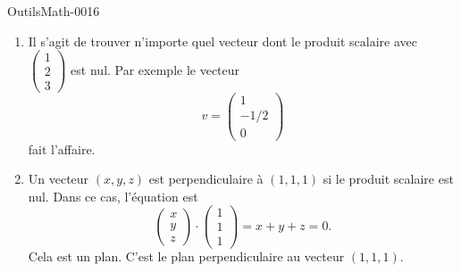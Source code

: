 
\begin{corrige}{OutilsMath-0016}

	\begin{enumerate}
		\item
			Il s'agit de trouver n'importe quel vecteur dont le produit scalaire avec $\begin{pmatrix}
				1	\\ 
				2	\\ 
				3	
			\end{pmatrix}$ est nul. Par exemple le vecteur
			\begin{equation}
				v=\begin{pmatrix}
					1	\\ 
						-1/2	\\ 
					0	
				\end{pmatrix}
			\end{equation}
			fait l'affaire.
		\item
			Un vecteur $(x,y,z)$ est perpendiculaire à $(1,1,1)$ si le produit scalaire est nul. Dans ce cas, l'équation est
			\begin{equation}
				\begin{pmatrix}
					x	\\ 
					y	\\ 
					z	
				\end{pmatrix}\cdot
				\begin{pmatrix}
					1	\\ 
					1	\\ 
					1	
				\end{pmatrix}=x+y+z=0.
			\end{equation}
			Cela est un plan. C'est le plan perpendiculaire au vecteur $(1,1,1)$.
	\end{enumerate}

\end{corrige}
